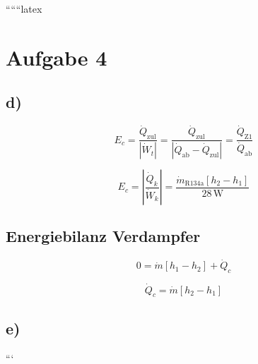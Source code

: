 ``````latex


\section*{Aufgabe 4}

\subsection*{d)}
\begin{equation*}
    E_c = \frac{\dot{Q}_{\text{zul}}}{\left| \dot{W}_t \right|} = \frac{\dot{Q}_{\text{zul}}}{\left| \dot{Q}_{\text{ab}} - \dot{Q}_{\text{zul}} \right|} = \frac{\dot{Q}_{\text{Z1}}}{\dot{Q}_{\text{ab}}}
\end{equation*}

\begin{equation*}
    E_c = \left| \frac{\dot{Q}_k}{\dot{W}_k} \right| = \frac{\dot{m}_{\text{R134a}} \left[ h_2 - h_1 \right]}{28 \, \text{W}}
\end{equation*}

\subsection*{Energiebilanz Verdampfer}
\begin{equation*}
    0 = \dot{m} \left[ h_1 - h_2 \right] + \dot{Q}_c
\end{equation*}

\begin{equation*}
    \dot{Q}_c = \dot{m} \left[ h_2 - h_1 \right]
\end{equation*}

\subsection*{e)}
```